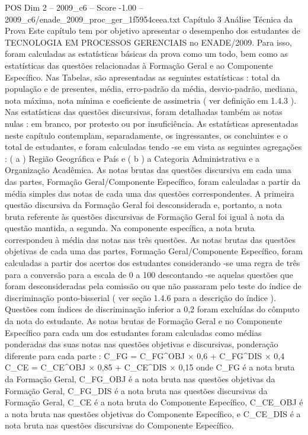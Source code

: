 \begin{textsample}{POS Dim 2 – 2009\_c6 – Score -1.00 – 2009\_c6/enade\_2009\_proc\_ger\_1f5954ceea.txt}  \label{ex:f2_pos_298}
Capítulo 3 Análise Técnica da Prova Este capítulo tem por objetivo apresentar o desempenho dos estudantes de TECNOLOGIA EM PROCESSOS GERENCIAIS no ENADE/2009.
Para isso, foram calculadas as estatísticas básicas da prova como um todo, bem como as estatísticas das questões relacionadas à Formação Geral e ao Componente Específico.
Nas Tabelas, são apresentadas as seguintes estatísticas : total da população e de presentes, média, erro-padrão da média, desvio-padrão, mediana, nota máxima, nota mínima e coeficiente de assimetria ( ver definição em 1.4.3 ).
Nas estatísticas das questões discursivas, foram detalhadas também as notas nulas : em branco, por protesto ou por insuficiência.
As estatísticas apresentadas neste capítulo contemplam, separadamente, os ingressantes, os concluintes e o total de estudantes, e foram calculadas tendo -se em vista as seguintes agregações : ( a ) Região Geográfica e País e ( b ) a Categoria Administrativa e a Organização Acadêmica.
As notas brutas das questões discursiva em cada uma das partes, Formação Geral/Componente Específico, foram calculadas a partir da média simples das notas de cada uma das questões correspondentes.
A primeira questão discursiva da Formação Geral foi desconsiderada e, portanto, a nota bruta referente às questões discursivas de Formação Geral foi igual à nota da questão mantida, a segunda.
Na componente específica, a nota bruta correspondeu à média das notas nas três questões.
As notas brutas das questões objetivas de cada uma das partes, Formação Geral/Componente Específico, foram calculadas a partir dos acertos dos estudantes considerando -se uma regra de três para a conversão para a escala de 0 a 100 descontando -se aquelas questões que foram desconsideradas pela comissão ou que não passaram pelo teste do índice de discriminação ponto-bisserial ( ver seção 1.4.6 para a descrição do índice ).
Questões com índices de discriminação inferior a 0,2 foram excluídas do cômputo da nota do estudante.
As notas brutas de Formação Geral e no Componente Específico para cada um dos estudantes foram calculadas como médias ponderadas das suas notas nas questões objetivas e discursivas, ponderação diferente para cada parte : C\_FG = C\_FG\textasciicircum{}OBJ × 0,6 + C\_FG\textasciicircum{}DIS × 0,4 C\_CE = C\_CE\textasciicircum{}OBJ × 0,85 + C\_CE\textasciicircum{}DIS × 0,15 onde C\_FG é a nota bruta da Formação Geral, C\_FG\_OBJ é a nota bruta nas questões objetivas da Formação Geral, C\_FG\_DIS é a nota bruta nas questões discursivas da Formação Geral, C\_CE é a nota bruta do Componente Específico, C\_CE\_OBJ é a nota bruta nas questões objetivas do Componente Específico, e C\_CE\_DIS é a nota bruta nas questões discursivas do Componente Específico.

\end{textsample}

